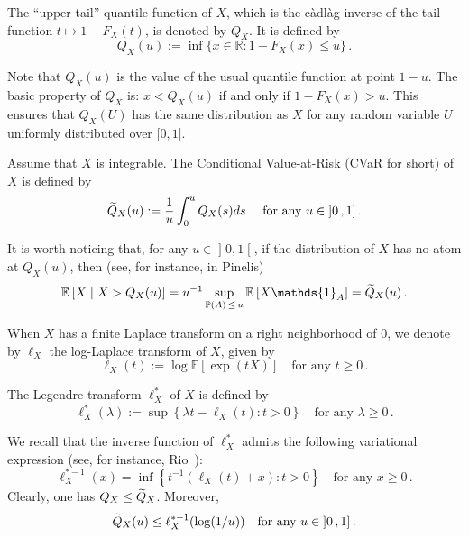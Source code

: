 \documentclass[AHL,Unicode,longabstracts,published]{cedram}
\newcommand{\bE}{\mathbb{E}}
\newcommand{\bP}{\mathbb{P}}
\newcommand{\bR}{\mathbb{R}}
\newcommand{\intervalleoo}[2]{\mathopen{]} #1\mathclose{}\mathpunct{},#2\mathclose{[}}
\newcommand{\intervalleff}[2]{\mathopen{[} #1\mathclose{}\mathpunct{},#2\mathclose{]}}
\newcommand{\intervalleof}[2]{\mathopen{]} #1\mathclose{}\mathpunct{},#2\mathclose{]}}
\newcommand{\ind}{\mathds{1}}
\let\oldtilde\tilde
\renewcommand*{\tilde}[1]{\mathchoice{\widetilde{#1}}{\widetilde{#1}}{\oldtilde{#1}}{\oldtilde{#1}}}
\begin{document}
\begin{defi}\label{def:CVaR}
The ``upper tail'' quantile function of $X$, which is the càdlàg inverse of the tail function $t\mapsto 1-F_X(t)$, is denoted by $Q_X$. It is defined by
\[
Q_X(u):=\inf\{x\in\bR:1-F_X(x)\leq u\}\,.
\]
\end{defi}

Note that $Q_X(u)$ is the value of the usual quantile function at point $1-u$. The basic property of $Q_X$ is: $x<Q_X(u)$ if and only if $1-F_X(x)>u$. This ensures that $Q_X(U)$ has the same distribution as $X$ for any random variable $U$ uniformly distributed over $\intervalleff 01$.


\begin{defi}
Assume that $X$ is integrable. The Conditional Value-at-Risk (CVaR for short) of $X$ is defined by
\begin{equation}\label{eqn:def CVaR}
\tilde Q_X(u):=\frac{1}{u}\int_0^u Q_X(s)ds\quad\text{ for any }u\in\intervalleof 01\,.
\end{equation}
\end{defi}

It is worth noticing that, for any $u\in\intervalleoo 01$, if the distribution of $X$ has no atom at $Q_X(u)$, then (see, for instance, \cite[Section~5.9]{Pinelis14b} in Pinelis)
\[
\bE\left[X\mid X>Q_X(u)\right]= u^{-1}\sup_{\bP(A)\,\leq\,u}\bE\left[X\ind_A\right]=\tilde Q_X(u)\,.
\]

When $X$ has a finite Laplace transform on a right neighborhood of $0$, we denote by $\ell_X$ the log-Laplace transform of $X$, given by
\begin{equation}\label{eqn:def logLaplace}
\ell_X(t):=\log\bE\left[\exp(tX)\right]\quad \text{for any }t\geq 0\,.
\end{equation}

The Legendre transform $\ell_X^*$ of $X$ is defined by
\begin{equation}\label{eqn:def Legendre transform}
\ell_X^*(\lambda):=\sup\left\{\lambda t - \ell_X(t) : t>0\right\}\quad\text{for any }\lambda\geq0\,.
\end{equation}

We recall that the inverse function of $\ell_X^*$ admits the following variational expression (see, for instance, Rio~\cite[Lemma~A.2]{Rio17b}):
\begin{equation}\label{eqn:inverse Legendre transform}
\ell_X^{*-1}(x)=\inf\left\{t^{-1}(\ell_X(t)+x) : t>0\right\}\quad\text{for any }x\geq 0\,.
\end{equation}
Clearly, one has $Q_X\leq\tilde Q_X$. Moreover,
\begin{equation}\label{eqn:comparaison CVAR Leg}
\tilde Q_X(u)\leq \ell^{*-1}_X(\log(1/u))\quad\text{for any }u\in\intervalleof 01\,.
\end{equation}
\end{document}
